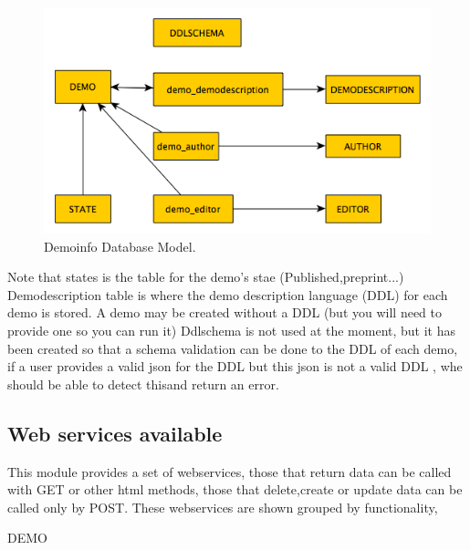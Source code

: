 \begin{figure}[!ht]
\centering
\includegraphics[width=0.5\columnwidth]{demo_info/images/demoinfo_model.png}
\caption{Demoinfo Database Model.} 
\label{fi:proxy_example}
\end{figure}

Note that states is the table for the demo's stae (Published,preprint...)
Demodescription table is where the demo description language (DDL) for each demo is stored.
A demo may be created without a DDL (but you will need to provide one so you can run it)
Ddlschema is not used at the moment, but it has been created so that a schema validation can be done to the DDL of each demo, if a user provides a valid json for the DDL but this json is not a valid DDL , whe should be able to detect thisand return an error.

\subsection{Web services available}
This module provides a set of webservices, those that return data can be called with GET or other html methods, those that delete,create or update data can be called only by POST.
These webservices are shown grouped by functionality, 


DEMO

